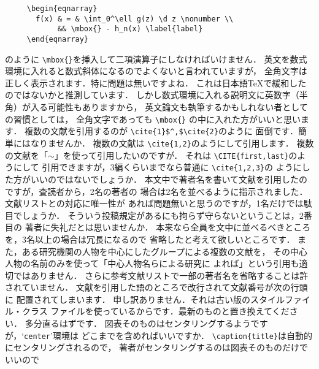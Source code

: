 \documentclass[dvipdfmx,onecolumn]{jsce}  %
\begin{document}
\begin{Enumerate}
\renewcommand{\baselinestretch}{0.75}\small\normalsize
\begin{verbatim}
     \begin{eqnarray}
       f(x) & = & \int_0^\ell g(z) \d z \nonumber \\
            && \mbox{} - h_n(x) \label{label}
     \end{eqnarray}
\end{verbatim}
\renewcommand{\baselinestretch}{1}\small\normalsize
のように \verb+\mbox{}+を挿入して二項演算子にしなければいけません．
%
\Qitem 英文を数式環境に入れると数式斜体になるのでよくないと言われていますが，
全角文字は正しく表示されます．特に問題は無いですよね．
\Aitem これは日本語\TeX で緩和したのではないかと推測しています．
しかし数式環境に入れる説明文に英数字（半角）が入る可能性もありますから，
英文論文も執筆するかもしれない者としての習慣としては，
全角文字であっても \verb+\mbox{}+ の中に入れた方がいいと思います．
%
\Qitem 複数の文献を引用するのが \verb+\cite{1}$^,$\cite{2}+のように
面倒です．簡単にはなりませんか．
\Aitem 複数の文献は \verb+\cite{1,2}+のようにして引用\cite{1,2}します．
%
\Qitem 複数の文献を「$\sim$」を使って引用したいのですが．
\Aitem それは \verb+\CITE{first,last}+のようにして
引用できますが，3編くらいまでなら普通に \verb+\cite{1,2,3}+の
ようにした方\cite{2,3,4}がいいのではないでしょうか．
%
\Qitem 本文中で著者名を書いて文献を引用したのですが，査読者から，2名の著者の
場合は2名を並べるように指示されました．文献リストとの対応に唯一性が
あれば問題無いと思うのですが，1名だけでは駄目でしょうか．
\Aitem そういう投稿規定があるにも拘らず守らないということは，2番目の
著者に失礼だとは思いませんか．
本来なら全員を文中に並べるべきところを，3名以上の場合は冗長になるので
省略したと考えて欲しいところです．
また，ある研究機関の人物を中心にしたグループによる複数の文献を，
その中心人物の名前のみを使って「中心人物名ら\cite{1,2}による研究に
よれば」という引用も適切ではありません．
さらに参考文献リストで一部の著者名を省略することは許されていません．
%
\Qitem 文献を引用した語のところで改行されて文献番号が次の行頭に
配置されてしまいます．
\Aitem 申し訳ありません．それは古い版のスタイルファイル・クラス
ファイルを使っているからです．最新のものと置き換えてください．
多分直るはずです．
%
\Qitem 図表そのものはセンタリングするようですが，`{\tt center}'環境は
どこまでを含めればいいですか．
\Aitem \verb+\caption{title}+は自動的にセンタリングされるので，
著者がセンタリングするのは図表そのものだけでいいので


\end{Enumerate}
\end{document}
